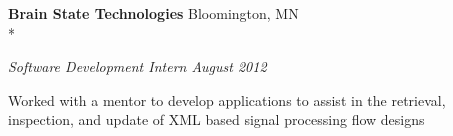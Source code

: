 \documentclass{article}
\newcommand{\position}[2]{
  \textit{#1 \hfill #2}
}
\newcommand{\affiliation}[2]{
  \textbf{#1} \hfill #2 \\*
}
\newenvironment{achievements}{
  \begin{compactitem} }{
  \end{compactitem}
}
\begin{document}
  \affiliation{Brain State Technologies}  {Bloomington, MN}
    \position {Software Development Intern} {August 2012}
    \begin{achievements}
      \item Worked with a mentor to develop applications to assist in the
            retrieval, inspection, and update of XML based signal processing 
            flow designs
      \begin{comment}
      \item Defined XML schema to bind application configuration parameters to 
            Java objects (using Apache XMLBeans)
      \end{comment}
    \end{achievements}

    \begin{comment}
    \position {Software Development Senior Project} {May 2011}
    \begin{achievements}
      \item Worked with a small team to develop an up-sampling filter for a
      proprietary signal processing flow engine to align signal data from
      sources with varying sample rates.
    \end{achievements}
    \end{comment}
\end{document}
